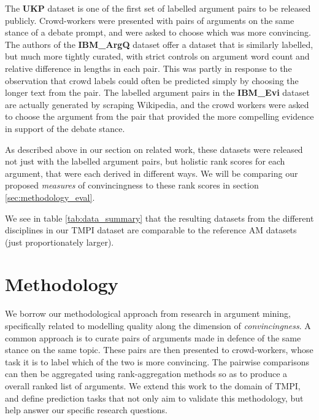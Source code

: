 \documentclass[notitlepage,12pt]{jedm}
\begin{document}
The \textbf{UKP} dataset \cite{habernal_which_2016} is one of the first set of 
labelled argument pairs to be released publicly.
Crowd-workers were presented with pairs of arguments on the same stance of a 
debate prompt, and were asked to choose which was more convincing.
The authors of the \textbf{IBM\_ArgQ} dataset \cite{toledo_automatic_2019} 
offer a dataset that is similarly labelled, but much more tightly curated, with 
strict controls on argument word count and relative difference in lengths in 
each pair.
This was partly in response to the observation that crowd labels could often be 
predicted simply by choosing the longer text from the pair.
The labelled argument pairs in the \textbf{IBM\_Evi} dataset 
\cite{gleize_are_2019} are actually generated by scraping Wikipedia, and the 
crowd workers were asked to choose the argument from the pair that provided the 
more compelling evidence in support of the debate stance.

As described above in our section on related work, these datasets were released 
not just with the labelled argument pairs, but holistic rank scores for each 
argument, that were each derived in different ways. 
We will be comparing our proposed \textit{measures} of convincingness to these 
rank scores in section \ref{sec:methodology_eval}.


We see in table \ref{tab:data_summary} that the resulting datasets from the 
different disciplines in our TMPI dataset are comparable to the reference AM 
datasets (just proportionately larger).


\section{Methodology}\label{sec:methodology}

We borrow our methodological approach from research in argument mining, 
specifically related to modelling quality along the dimension of 
\textit{convincingness}.
A common approach is to curate pairs of arguments made in defence of the same 
stance on the same topic.
These pairs are then presented to crowd-workers, whose task it is to label 
which of the two is more convincing. 
The pairwise comparisons can then be aggregated using rank-aggregation 
methods so as to produce a overall ranked list of arguments.
We extend this work to the domain of TMPI, and define prediction tasks that not 
only aim to validate this methodology, but help answer our specific research 
questions.
\end{document}
